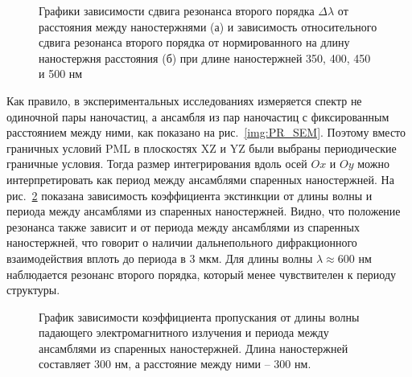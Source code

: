 \begin{figure}
\caption{Графики зависимости сдвига резонанса второго порядка $ \Delta \lambda $ от расстояния между наностержнями (а) и зависимость относительного сдвига резонанса второго порядка от нормированного на длину  наностержня расстояния (б) при длине наностержней 350, 400, 450 и 500 нм }
\label{img:ruler2}
\end{figure}

Как правило, в экспериментальных исследованиях измеряется спектр не одиночной пары наночастиц, а ансамбля из пар наночастиц с фиксированным расстоянием между ними, как показано на рис.~\ref{img:PR_SEM}. Поэтому вместо граничных условий PML в плоскостях XZ и YZ были выбраны периодические граничные условия. Тогда размер интегрирования вдоль осей $ Ox $ и $ Oy $ можно интерпретировать как период между ансамблями спаренных наностержней. На рис.~\ref{img:BCperiod} показана зависимость коэффициента экстинкции от длины волны и периода между ансамблями из спаренных наностержней. Видно, что положение резонанса также зависит и от периода между ансамблями из спаренных наностержней, что говорит о наличии дальнепольного дифракционного взаимодействия  вплоть до периода в 3 мкм. Для длины волны $ \lambda \approx 600$ нм наблюдается резонанс второго порядка, который менее чувствителен к периоду структуры.

\begin{figure}
\caption{График зависимости коэффициента пропускания от длины волны падающего электромагнитного излучения и периода между ансамблями из спаренных наностержней. Длина наностержней составляет 300 нм, а расстояние между ними -- 300 нм.}
\label{img:BCperiod}
\end{figure}

